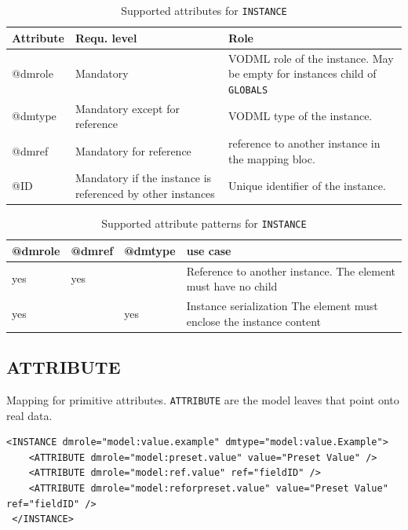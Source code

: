 \documentclass[11pt,a4paper]{ivoa}
\begin{document}
\begin{table}[ht!]
     \begin{tabular}{|p{1.5cm}|p{4cm}|p{7cm}|}
       \hline Attribute & Requ. level & Role\\
       \hline  @dmrole   & Mandatory & VODML role of the instance. May be empty for instances child of 
                                      \texttt{GLOBALS}  \\
       \hline  @dmtype  & Mandatory except for reference & VODML type of the instance.   \\
       \hline  @dmref  & Mandatory for reference & reference to another instance in the mapping bloc. \\          
       \hline  @ID  & Mandatory if the instance is referenced by other instances & Unique identifier of the instance. \\
       \hline 
     \end{tabular}
     \caption{Supported attributes for  \texttt{INSTANCE}} 
 \end{table}

\begin{table}[ht!]
\begin{tabular}{|p{1.5cm}|p{1.5cm}|p{1.5cm}|p{5cm}|}
\hline @dmrole & @dmref &  @dmtype &  use case\\
\hline  yes & yes &  & Reference to another instance. The element must have no child  \\
\hline  yes &  & yes  & Instance serialization The element must enclose the instance content  \\
\hline 
\end{tabular}
     \caption{Supported attribute patterns for  \texttt{INSTANCE}} 
 \end{table}

\subsection{ATTRIBUTE}

Mapping for primitive attributes. \texttt{ATTRIBUTE}  are the model leaves that point onto real data. 


\begin{lstlisting}[caption={ATTRIBUTE examples},captionpos=b]
<INSTANCE dmrole="model:value.example" dmtype="model:value.Example">
    <ATTRIBUTE dmrole="model:preset.value" value="Preset Value" />    
    <ATTRIBUTE dmrole="model:ref.value" ref="fieldID" />    
    <ATTRIBUTE dmrole="model:reforpreset.value" value="Preset Value" ref="fieldID" />
 </INSTANCE>
\end{lstlisting}
\end{document}
